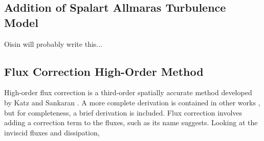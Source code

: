 \documentclass[draft]{aiaa-pretty}
\begin{document}
\subsection{Addition of Spalart Allmaras Turbulence Model}
Oisin will probably write this...

\subsection{Flux Correction High-Order Method}
High-order flux correction is a third-order spatially accurate method developed by Katz and Sankaran \cite{}.  A more complete derivation is contained in other works \cite{}, but
for completeness, a brief derivation is included.  Flux correction involves adding a correction term to the fluxes, such as its name suggests. Looking at the inviscid fluxes and 
dissipation,
\end{document}
